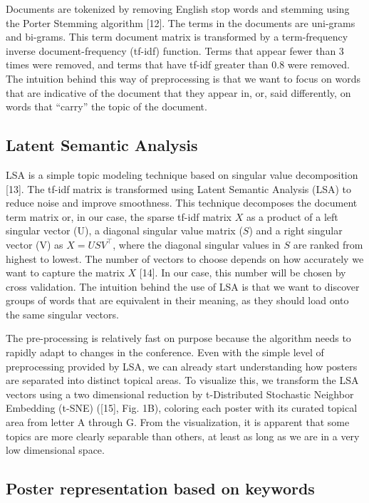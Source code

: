 \documentclass[a4paper]{article}
\begin{document}
Documents are tokenized by removing English stop words and stemming using the Porter Stemming algorithm [12]. The terms in the documents are uni-grams and bi-grams. This term document matrix is transformed by a term-frequency inverse document-frequency (tf-idf) function. Terms that appear fewer than 3 times were removed, and terms that have tf-idf greater than 0.8 were removed. The intuition behind this way of preprocessing is that we want to focus on words that are indicative of the document that they appear in, or, said differently, on words that “carry” the topic of the document.

\subsection{Latent Semantic Analysis}

LSA is a simple topic modeling technique based on singular value decomposition [13]. The tf-idf matrix is transformed using Latent Semantic Analysis (LSA) to reduce noise and improve smoothness. This technique decomposes the document term matrix or, in our case, the sparse tf-idf matrix $X$ as a product of a left singular vector (U), a diagonal singular value matrix ($S$) and a right singular vector (V) as $X = USV^\top$, where the diagonal singular values in $S$ are ranked from highest to lowest. The number of vectors to choose depends on how accurately we want to capture the matrix $X$ [14]. In our case, this number will be chosen by cross validation. The intuition behind the use of LSA is that we want to discover groups of words that are equivalent in their meaning, as they should load onto the same singular vectors.


The pre-processing is relatively fast on purpose because the algorithm needs to rapidly adapt to changes in the conference. Even with the simple level of preprocessing provided by LSA, we can already start understanding how posters are separated into distinct topical areas. To visualize this, we transform the LSA vectors using a two dimensional reduction by t-Distributed Stochastic Neighbor Embedding (t-SNE) ([15], Fig. 1B), coloring each poster with its curated topical area from letter A through G. From the visualization, it is apparent that some topics are more clearly separable than others, at least as long as we are in a very low dimensional space.

\subsection{Poster representation based on keywords}
\end{document}
